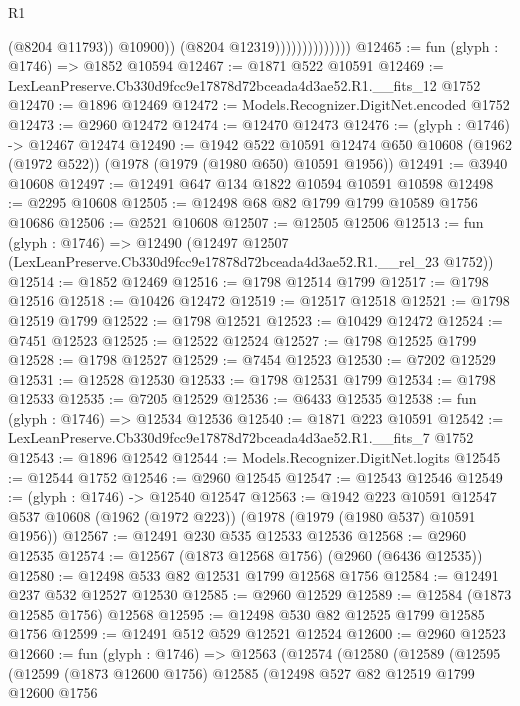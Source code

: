 \begin{lexlean}{R1}
\begin{coremodule}
                                    (@8204 @11793))
                                  @10900))
                              (@8204 @12319))))))))))))))
@12465 := fun (glyph : @1746) => @1852 @10594
@12467 := @1871 @522 @10591
@12469 := LexLeanPreserve.Cb330d9fcc9e17878d72bceada4d3ae52.R1.__fits_12 @1752
@12470 := @1896 @12469
@12472 := Models.Recognizer.DigitNet.encoded @1752
@12473 := @2960 @12472
@12474 := @12470 @12473
@12476 := (glyph : @1746) -> @12467 @12474
@12490 := @1942
    @522
    @10591
    @12474
    @650
    @10608
    (@1962 (@1972 @522))
    (@1978 (@1979 (@1980 @650) @10591 @1956))
@12491 := @3940 @10608
@12497 := @12491 @647 @134 @1822 @10594 @10591 @10598
@12498 := @2295 @10608
@12505 := @12498 @68 @82 @1799 @1799 @10589 @1756 @10686
@12506 := @2521 @10608
@12507 := @12505 @12506
@12513 := fun (glyph : @1746) =>
  @12490 (@12497 @12507 (LexLeanPreserve.Cb330d9fcc9e17878d72bceada4d3ae52.R1.__rel_23 @1752))
@12514 := @1852 @12469
@12516 := @1798 @12514 @1799
@12517 := @1798 @12516
@12518 := @10426 @12472
@12519 := @12517 @12518
@12521 := @1798 @12519 @1799
@12522 := @1798 @12521
@12523 := @10429 @12472
@12524 := @7451 @12523
@12525 := @12522 @12524
@12527 := @1798 @12525 @1799
@12528 := @1798 @12527
@12529 := @7454 @12523
@12530 := @7202 @12529
@12531 := @12528 @12530
@12533 := @1798 @12531 @1799
@12534 := @1798 @12533
@12535 := @7205 @12529
@12536 := @6433 @12535
@12538 := fun (glyph : @1746) => @12534 @12536
@12540 := @1871 @223 @10591
@12542 := LexLeanPreserve.Cb330d9fcc9e17878d72bceada4d3ae52.R1.__fits_7 @1752
@12543 := @1896 @12542
@12544 := Models.Recognizer.DigitNet.logits
@12545 := @12544 @1752
@12546 := @2960 @12545
@12547 := @12543 @12546
@12549 := (glyph : @1746) -> @12540 @12547
@12563 := @1942
    @223
    @10591
    @12547
    @537
    @10608
    (@1962 (@1972 @223))
    (@1978 (@1979 (@1980 @537) @10591 @1956))
@12567 := @12491 @230 @535 @12533 @12536
@12568 := @2960 @12535
@12574 := @12567 (@1873 @12568 @1756) (@2960 (@6436 @12535))
@12580 := @12498 @533 @82 @12531 @1799 @12568 @1756
@12584 := @12491 @237 @532 @12527 @12530
@12585 := @2960 @12529
@12589 := @12584 (@1873 @12585 @1756) @12568
@12595 := @12498 @530 @82 @12525 @1799 @12585 @1756
@12599 := @12491 @512 @529 @12521 @12524
@12600 := @2960 @12523
@12660 := fun (glyph : @1746) =>
  @12563
    (@12574
      (@12580
        (@12589
          (@12595
            (@12599
              (@1873 @12600 @1756)
              @12585
              (@12498
                @527
                @82
                @12519
                @1799
                @12600
                @1756

\end{coremodule}
\end{lexlean}
